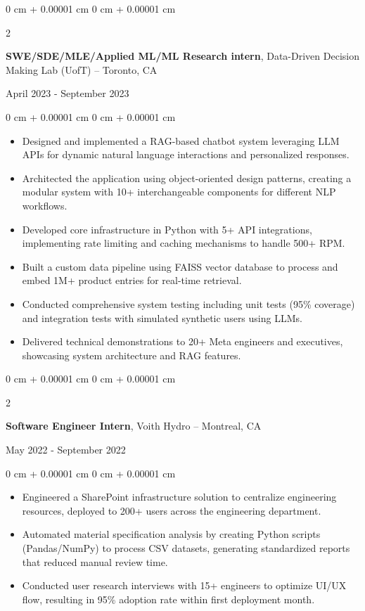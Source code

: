 \documentclass[11pt, letterpaper]{article}
\newenvironment{highlights}{
    \begin{itemize}[
        topsep=0.08 cm,
        parsep=0.08 cm,
        partopsep=0pt,
        itemsep=0pt,
        leftmargin=0.2 cm + 17pt
    ]
}
{
    \end{itemize}
}
\newenvironment{onecolentry}{
    \begin{adjustwidth}{
        0 cm + 0.00001 cm
    }{
        0 cm + 0.00001 cm
    }
}{
    \end{adjustwidth}
}
\newenvironment{twocolentry}[2][]{
    \onecolentry
    \def\secondColumn{#2}
    \setcolumnwidth{\fill, 4.5 cm}
    \begin{paracol}{2}
}{
    \switchcolumn \raggedleft \secondColumn
    \end{paracol}
    \endonecolentry
}
\begin{document}
\begin{twocolentry}{April 2023 - September 2023}
    {\textbf{SWE/SDE/MLE/Applied ML/ML Research intern}}, Data-Driven Decision Making Lab (UofT) -- Toronto, CA
\end{twocolentry}
\vspace{0.1cm}
\begin{onecolentry}
    \begin{highlights}
        \item Designed and implemented a RAG-based chatbot system leveraging LLM APIs for dynamic natural language interactions and personalized responses.
        \item Architected the application using object-oriented design patterns, creating a modular system with 10+ interchangeable components for different NLP workflows.
        \item Developed core infrastructure in Python with 5+ API integrations, implementing rate limiting and caching mechanisms to handle 500+ RPM.
        \item Built a custom data pipeline using FAISS vector database to process and embed 1M+ product entries for real-time retrieval.
        \item Conducted comprehensive system testing including unit tests (95\% coverage) and integration tests with simulated synthetic users using LLMs.
        \item Delivered technical demonstrations to 20+ Meta engineers and executives, showcasing system architecture and RAG features.
    \end{highlights}
\end{onecolentry}
\vspace{0.35 cm}

\begin{twocolentry}{May 2022 - September 2022}
    {\textbf{Software Engineer Intern}}, Voith Hydro -- Montreal, CA
\end{twocolentry}
\vspace{0.1cm}
\begin{onecolentry}
    \begin{highlights}
        \item Engineered a SharePoint infrastructure solution to centralize engineering resources, deployed to 200+ users across the engineering department.
        \item Automated material specification analysis by creating Python scripts (Pandas/NumPy) to process CSV datasets, generating standardized reports that reduced manual review time.
        \item Conducted user research interviews with 15+ engineers to optimize UI/UX flow, resulting in 95\% adoption rate within first deployment month.
    \end{highlights}
\end{onecolentry}
\end{document}
